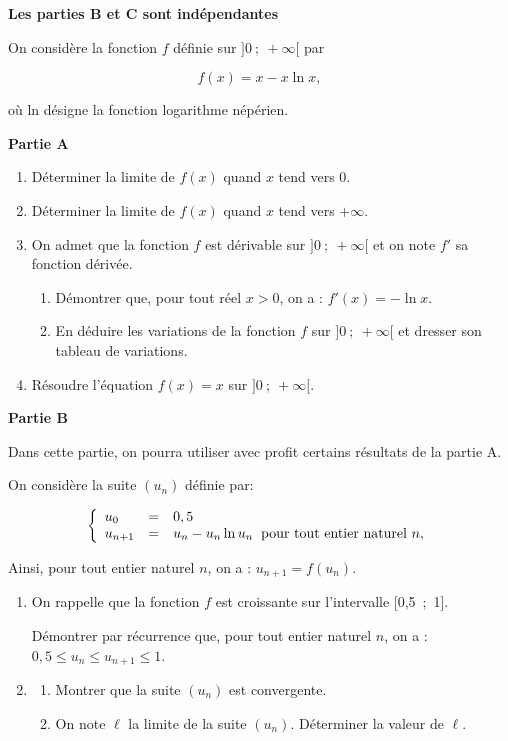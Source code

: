 \medskip

\textbf{Les parties B et C sont indépendantes}

\medskip

On considère la fonction $f$  définie sur $]0~;~+\infty[$ par

\[f(x) = x - x \ln x,\]

où ln désigne la fonction logarithme népérien.

\bigskip

\textbf{Partie A}

\medskip

\begin{enumerate}
\item Déterminer la limite de $f(x)$ quand $x$ tend vers $0$.
\item Déterminer la limite de $f(x)$ quand $x$ tend vers $+\infty$.
\item On admet que la fonction $f$ est dérivable sur $]0~;~+\infty[$ et on note $f'$ sa fonction dérivée.
	\begin{enumerate}
		\item Démontrer que, pour tout réel $x > 0$, on a : $f'(x) = - \ln x$.
		\item En déduire les variations de la fonction $f$ sur $]0~;~+\infty[$ et dresser son tableau de variations.
	\end{enumerate}
\item Résoudre l'équation $f(x) = x$ sur $]0~;~+\infty[$.
\end{enumerate}

\bigskip

\textbf{Partie B}

\medskip

Dans cette partie, on pourra utiliser avec profit certains résultats de la partie A.

On considère la suite $\left(u_n\right)$ définie par:

\[\left\{\begin{array}{l c l}
u_0 &=& 0,5\\
u_{n+1} &=& u_n - u_n \ln u_n \:\text{ pour tout entier naturel } n,
\end{array}\right.\]

Ainsi, pour tout entier naturel $n$, on a : $u_{n+1} = f\left(u_n\right)$.

\medskip

\begin{enumerate}
\item On rappelle que la fonction $f$ est croissante sur l'intervalle [0,5~;~1].

Démontrer par récurrence que, pour tout entier naturel $n$, on a : $0,5 \leqslant  u_n \leqslant u_{n+1} \leqslant 1$.
\item 
	\begin{enumerate}
		\item Montrer que la suite $\left(u_n\right)$ est convergente.
		\item On note $\ell$ la limite de la suite $\left(u_n\right)$. Déterminer la valeur de $\ell$.
	\end{enumerate}
\end{enumerate}

